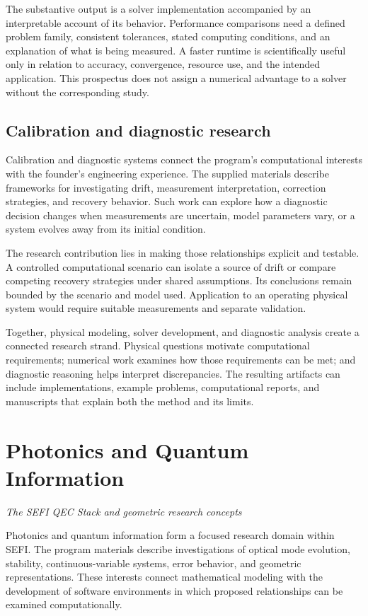 \documentclass[10pt,letterpaper]{article}
\newcommand{\pageheading}[2]{\clearpage\section{#1}\textit{#2}\par\medskip}
\begin{document}
The substantive output is a solver implementation accompanied by an interpretable account of its behavior. Performance comparisons need a defined problem family, consistent tolerances, stated computing conditions, and an explanation of what is being measured. A faster runtime is scientifically useful only in relation to accuracy, convergence, resource use, and the intended application. This prospectus does not assign a numerical advantage to a solver without the corresponding study.

\subsection{Calibration and diagnostic research}
Calibration and diagnostic systems connect the program's computational interests with the founder's engineering experience. The supplied materials describe frameworks for investigating drift, measurement interpretation, correction strategies, and recovery behavior. Such work can explore how a diagnostic decision changes when measurements are uncertain, model parameters vary, or a system evolves away from its initial condition.

The research contribution lies in making those relationships explicit and testable. A controlled computational scenario can isolate a source of drift or compare competing recovery strategies under shared assumptions. Its conclusions remain bounded by the scenario and model used. Application to an operating physical system would require suitable measurements and separate validation.

Together, physical modeling, solver development, and diagnostic analysis create a connected research strand. Physical questions motivate computational requirements; numerical work examines how those requirements can be met; and diagnostic reasoning helps interpret discrepancies. The resulting artifacts can include implementations, example problems, computational reports, and manuscripts that explain both the method and its limits.

\pageheading{Photonics and Quantum Information}{The SEFI QEC Stack and geometric research concepts}
Photonics and quantum information form a focused research domain within SEFI. The program materials describe investigations of optical mode evolution, stability, continuous-variable systems, error behavior, and geometric representations. These interests connect mathematical modeling with the development of software environments in which proposed relationships can be examined computationally.
\end{document}
